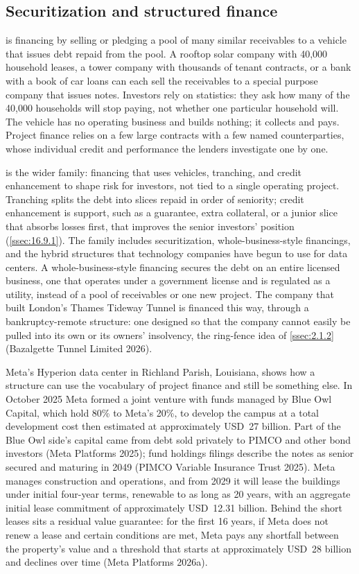 \subsection{Securitization and structured finance}\label{ssec:2.4.5}

 is financing by selling or pledging a pool of many similar receivables to a vehicle that issues debt repaid from the pool. A rooftop solar company with 40,000 household leases, a tower company with thousands of tenant contracts, or a bank with a book of car loans can each sell the receivables to a special purpose company that issues notes. Investors rely on statistics: they ask how many of the 40,000 households will stop paying, not whether one particular household will. The vehicle has no operating business and builds nothing; it collects and pays. Project finance relies on a few large contracts with a few named counterparties, whose individual credit and performance the lenders investigate one by one.

 is the wider family: financing that uses vehicles, tranching, and credit enhancement to shape risk for investors, not tied to a single operating project. Tranching splits the debt into slices repaid in order of seniority; credit enhancement is support, such as a guarantee, extra collateral, or a junior slice that absorbs losses first, that improves the senior investors' position (\cref{ssec:16.9.1}). The family includes securitization, whole-business-style financings, and the hybrid structures that technology companies have begun to use for data centers. A whole-business-style financing secures the debt on an entire licensed business, one that operates under a government license and is regulated as a utility, instead of a pool of receivables or one new project. The company that built London's Thames Tideway Tunnel is financed this way, through a bankruptcy-remote structure: one designed so that the company cannot easily be pulled into its own or its owners' insolvency, the ring-fence idea of \cref{ssec:2.1.2} (Bazalgette Tunnel Limited 2026).

Meta's Hyperion data center in Richland Parish, Louisiana, shows how a structure can use the vocabulary of project finance and still be something else. In October 2025 Meta formed a joint venture with funds managed by Blue Owl Capital, which hold 80\% to Meta's 20\%, to develop the campus at a total development cost then estimated at approximately USD~27 billion. Part of the Blue Owl side's capital came from debt sold privately to PIMCO and other bond investors (Meta Platforms 2025); fund holdings filings describe the notes as senior secured and maturing in 2049 (PIMCO Variable Insurance Trust 2025). Meta manages construction and operations, and from 2029 it will lease the buildings under initial four-year terms, renewable to as long as 20 years, with an aggregate initial lease commitment of approximately USD~12.31 billion. Behind the short leases sits a residual value guarantee: for the first 16 years, if Meta does not renew a lease and certain conditions are met, Meta pays any shortfall between the property's value and a threshold that starts at approximately USD~28 billion and declines over time (Meta Platforms 2026a).

